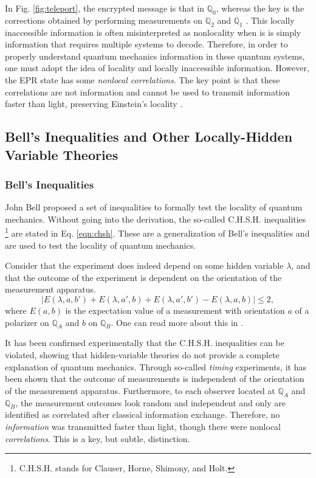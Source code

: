 \documentclass[%
 aip,
cp,  %
 amsmath,amssymb,%
 reprint,%
]{revtex4-2}
\newcommand{\Q}{\mathbb{Q}}
\begin{document}
    In Fig. \ref{fig:teleport},  the encrypted message is that in $\Q_0$, whereas the key is the corrections obtained by performing measurements on $\Q_2$ and $\Q_1$ \cite{nielsen_chuang_2010}. This locally inaccessible information is often misinterpreted as nonlocality when is is simply information that requires multiple systems to decode. Therefore, in order to properly understand quantum mechanics information in these quantum systems, one must adopt the idea of locality and locally inaccessible information. However, the EPR state has some \textit{nonlocal correlations}. The key point is that these correlations are not information and cannot be used to transmit information faster than light, preserving Einstein's locality \cite{aspect}.

\subsection{Bell's Inequalities and Other Locally-Hidden Variable Theories}
    \subsubsection{Bell's Inequalities}
        John Bell proposed a set of inequalities to formally test the locality of quantum mechanics. Without going into the derivation, the so-called C.H.S.H. inequalities \footnote{C.H.S.H. stands for Clauser, Horne, Shimony, and Holt.} \cite{chsh} are stated in Eq. \eqref{eqn:chsh}. These are a generalization of Bell's inequalities and are used to test the locality of quantum mechanics.

        Consider that the experiment does indeed depend on some hidden variable $\lambda$, and that the outcome of the experiment is dependent on the orientation of the measurement apparatus.
        \begin{equation}  \label{eqn:chsh}
            |E(\lambda, a,b') + E(\lambda, a',b) + E(\lambda, a',b') - E(\lambda, a,b)| \leq 2,
        \end{equation}
        where $E(a,b)$ is the expectation value of a measurement with orientation $a$ of a polarizer on $\Q_A$ and $b$ on $\Q_B$. One can read more about this in \cite{aspect}.

        It has been confirmed experimentally that the C.H.S.H. inequalities can be violated, showing that hidden-variable theories do not provide a complete explanation of quantum mechanics. Through so-called \textit{timing} experiments, it has been shown that the outcome of measurements is independent of the orientation of the measurement apparatus. Furthermore, to each observer located at $\Q_A$ and $\Q_B$, the measurement outcomes look random and independent and only are identified as correlated after classical information exchange. Therefore, no \textit{information} was transmitted faster than light, though there were nonlocal \textit{correlations}. This is a key, but subtle, distinction.
\end{document}
